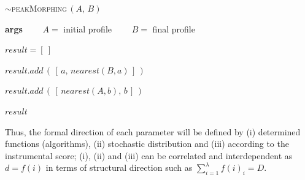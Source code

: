   
\bigskip

\begin{algorithm}
\caption{$\sim$\textsc{peakMorphing}$\,(A, \,B )$}\label{pm}
\begin{algorithmic}%

\State \textbf{args}
\State $\qquad A=$ initial profile
\State $\qquad B=$ final profile

\State 
\State $result=[\:]$


$result.add\,(\,[\,a,\,nearest(B, a)\,]\,)$

\EndFor


$result.add\,(\,[\,nearest(A, b),\,b\,]\,)$

\EndFor

\noindent \Return $result$

\end{algorithmic}
\end{algorithm}

Thus, the formal direction of each parameter will be defined by (i) determined functions (algorithms), (ii) stochastic distribution and (iii) according to the instrumental score; (i), (ii) and (iii) can be correlated and interdependent as $d=f(i)$ in terms of structural direction such as $\displaystyle \sum\limits_{i=1}^{\lambda}f(i)_i=D$.

